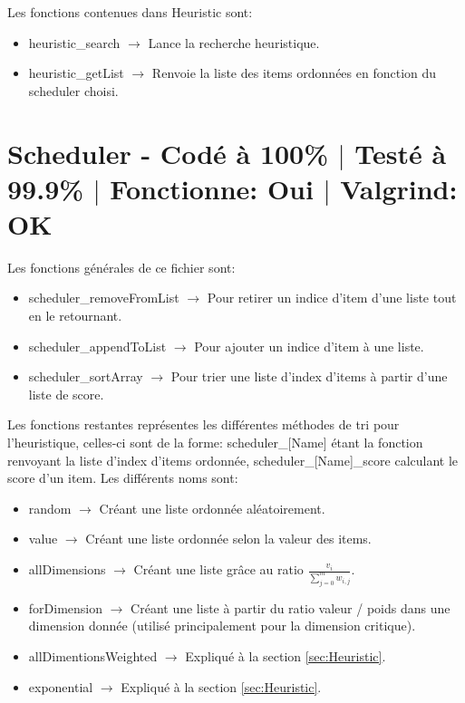 \documentclass{EPUProjetPeiP}
\newcommand{\comp}[5]{
	\section[#1]{#1 {\small - Codé à #2\% $\vert$ Testé à #3\% $\vert$ Fonctionne: #4 $\vert$ Valgrind: #5}}
}
\begin{document}
Les fonctions contenues dans Heuristic sont:
\begin{itemize}
	\item heuristic\_search $\longrightarrow$ Lance la recherche heuristique.
	\item heuristic\_getList $\longrightarrow$ Renvoie la liste des items ordonnées en fonction du scheduler choisi.
\end{itemize}

\comp{Scheduler \label{sec:Scheduler}}{100}{99.9}{Oui}{OK}
Les fonctions générales de ce fichier sont:
\begin{itemize}
	\item scheduler\_removeFromList $\longrightarrow$ Pour retirer un indice d'item d'une liste tout en le retournant.
	\item scheduler\_appendToList $\longrightarrow$ Pour ajouter un indice d'item à une liste.
	\item scheduler\_sortArray $\longrightarrow$ Pour trier une liste d'index d'items à partir d'une liste de score.\\
\end{itemize}

Les fonctions restantes représentes les différentes méthodes de tri pour l'heuristique, celles-ci sont de la forme: scheduler\_[Name] étant la fonction renvoyant la liste d'index d'items ordonnée, scheduler\_[Name]\_score calculant le score d'un item.
Les différents noms sont:
\begin{itemize}
	\item random $\longrightarrow$ Créant une liste ordonnée aléatoirement.
	\item value $\longrightarrow$ Créant une liste ordonnée selon la valeur des items.
	\item allDimensions $\longrightarrow$ Créant une liste grâce au ratio $\frac{v_i}{\sum_{j=0}^mw_{i,j}}$.
	\item forDimension $\longrightarrow$ Créant une liste à partir du ratio valeur / poids dans une dimension donnée (utilisé principalement pour la dimension critique).
	\item allDimentionsWeighted  $\longrightarrow$ Expliqué à la section \ref{sec:Heuristic}.
	\item exponential  $\longrightarrow$ Expliqué à la section \ref{sec:Heuristic}.
\end{itemize}
\end{document}
